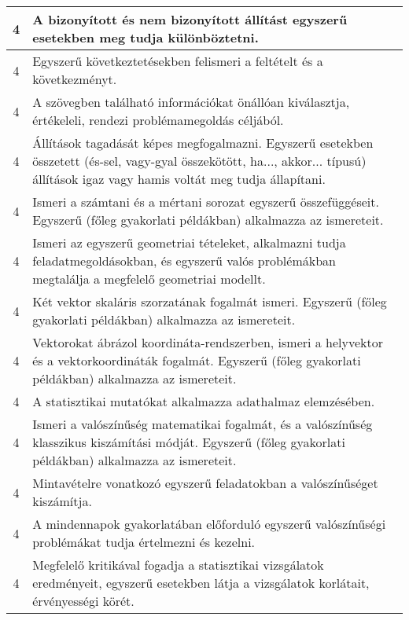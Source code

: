 \begin{longtable}{c | p{} }
                                
                                          4 &  A bizonyított és nem bizonyított állítást egyszerű esetekben meg tudja különböztetni. \\ \hline
                                          4 &  Egyszerű következtetésekben felismeri a feltételt és a következményt. \\ \hline
                                          4 &  A szövegben található információkat önállóan kiválasztja, értékeleli, rendezi problémamegoldás céljából. \\ \hline
                                          4 &  Állítások tagadását képes megfogalmazni. Egyszerű esetekben összetett (és-sel, vagy-gyal összekötött, ha..., akkor... típusú) állítások igaz vagy hamis voltát meg tudja állapítani. \\ \hline
                                          4 &  Ismeri a számtani és a mértani sorozat egyszerű összefüggéseit. Egyszerű (főleg gyakorlati példákban) alkalmazza az ismereteit. \\ \hline
                                          4 &  Ismeri az egyszerű geometriai tételeket, alkalmazni tudja feladatmegoldásokban, és egyszerű valós problémákban megtalálja a megfelelő geometriai modellt. \\ \hline
                                          4 &  Két vektor skaláris szorzatának fogalmát ismeri.  Egyszerű (főleg gyakorlati példákban) alkalmazza az ismereteit. \\ \hline
                                          4 &  Vektorokat ábrázol koordináta-rendszerben, ismeri a helyvektor és a vektorkoordináták fogalmát. Egyszerű (főleg gyakorlati példákban) alkalmazza az ismereteit. \\ \hline
                                          4 &  A statisztikai mutatókat alkalmazza adathalmaz elemzésében. \\ \hline
                                          4 &  Ismeri a valószínűség matematikai fogalmát, és a valószínűség klasszikus kiszámítási módját. Egyszerű (főleg gyakorlati példákban) alkalmazza az ismereteit. \\ \hline
                                          4 &  Mintavételre vonatkozó egyszerű feladatokban a valószínűséget kiszámítja. \\ \hline
                                          4 &  A mindennapok gyakorlatában előforduló egyszerű valószínűségi problémákat tudja értelmezni és kezelni. \\ \hline
                                          4 &  Megfelelő kritikával fogadja a statisztikai vizsgálatok eredményeit, egyszerű esetekben látja a vizsgálatok korlátait, érvényességi körét. \\ \hline
                                      
                        \end{longtable}
            \clearpage

